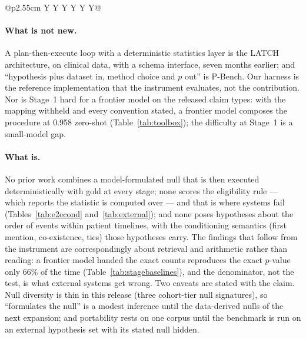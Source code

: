 \begin{table}[t]
\begin{tabularx}{\textwidth}{@{}p{2.55cm} Y Y Y Y Y Y@{}}
\bottomrule
\end{tabularx}
\caption{Positioning against the closest benchmarks and systems. The four
closest (P-Bench, LATCH, StatFormBench, StatABench) were read in full; the rest
from abstracts. ``Gold at intermediate stages'' is what makes per-stage
attribution possible; ``event-order claims'' means hypotheses about the order or
timing of events within a record.}
\label{tab:related}
\end{table}

\paragraph{What is not new.} A plan-then-execute loop with a deterministic
statistics layer is the LATCH architecture, on clinical data, with a schema
interface, seven months earlier; and ``hypothesis plus dataset in, method choice
and $p$ out'' is P-Bench. Our harness is the reference implementation that the
instrument evaluates, not the contribution. Nor is Stage~1 hard for a frontier
model on the released claim types: with the mapping withheld and every
convention stated, a frontier model composes the procedure at 0.958 zero-shot
(Table~\ref{tab:toolbox}); the difficulty at Stage~1 is a small-model gap.

\paragraph{What is.} No prior work combines a model-formulated null that is then
executed deterministically with gold at every stage; none scores the
eligibility rule --- which reports the statistic is computed over --- and that is
where systems fail (Tables~\ref{tab:e2econd} and~\ref{tab:external}); and none
poses hypotheses about the order of events within patient timelines, with the
conditioning semantics (first mention, co-existence, ties) those hypotheses
carry. The findings that follow from the instrument are correspondingly about
retrieval and arithmetic rather than reading: a frontier model handed the exact
counts reproduces the exact $p$-value only 66\% of the time
(Table~\ref{tab:stagebaselines}), and the denominator, not the test, is what
external systems get wrong. Two caveats are stated with the claim. Null
diversity is thin in this release (three cohort-tier null signatures), so
``formulates the null'' is a modest inference until the data-derived nulls of
the next expansion; and portability rests on one corpus until the benchmark is
run on an external hypothesis set with its stated null hidden.

